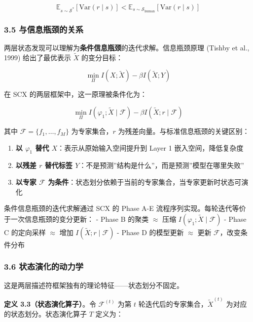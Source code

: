 \documentclass[
  12pt,
]{ctexart}
\providecommand{\tightlist}{%
  \setlength{\itemsep}{0pt}\setlength{\parskip}{0pt}}
\begin{document}
\[\mathbb{E}_{s \sim \mathcal{S}^*}[\text{Var}(r \mid s)] < \mathbb{E}_{s \sim \mathcal{S}_{\text{human}}}[\text{Var}(r \mid s)]\]

\subsubsection{3.5
与信息瓶颈的关系}\label{ux4e0eux4fe1ux606fux74f6ux9888ux7684ux5173ux7cfb}

两层状态发现可以理解为\textbf{条件信息瓶颈}的迭代求解。信息瓶颈原理
(Tishby et al., 1999) 给出了最优表示 \(\tilde{X}\) 的变分目标：

\[\min_{\Pi} I(X; \tilde{X}) - \beta I(\tilde{X}; Y)\]

在 SCX 的两层框架中，这一原理被条件化为：

\[\min_{\Pi} I(\varphi_1; \tilde{X} \mid \mathcal{F}) - \beta I(\tilde{X}; r \mid \mathcal{F})\]

其中 \(\mathcal{F} = \{f_1, \dots, f_M\}\) 为专家集合，\(r\)
为残差向量。与标准信息瓶颈的关键区别：

\begin{enumerate}
\def\labelenumi{\arabic{enumi}.}
\tightlist
\item
  \textbf{以 \(\varphi_1\) 替代 \(X\)}：表示从原始输入空间提升到 Layer 1
  嵌入空间，降低复杂度
\item
  \textbf{以残差 \(r\) 替代标签
  \(Y\)}：不是预测''结构是什么''，而是预测''模型在哪里失败''
\item
  \textbf{以专家 \(\mathcal{F}\)
  为条件}：状态划分依赖于当前的专家集合，当专家更新时状态可演化
\end{enumerate}

条件信息瓶颈的迭代求解通过 SCX 的 Phase A-E
流程序列实现。每轮迭代等价于一次信息瓶颈的变分更新： - Phase B 的聚类
\(\approx\) 压缩 \(I(\varphi_1; \tilde{X} \mid \mathcal{F})\) - Phase C
的定向采样 \(\approx\) 增加 \(I(\tilde{X}; r \mid \mathcal{F})\) - Phase
D 的模型更新 \(\approx\) 更新 \(\mathcal{F}\)，改变条件分布

\subsubsection{3.6
状态演化的动力学}\label{ux72b6ux6001ux6f14ux5316ux7684ux52a8ux529bux5b66}

这是两层描述符框架独有的理论特征------状态划分不固定。

\textbf{定义 3.3（状态演化算子）}。令 \(\mathcal{F}^{(t)}\) 为第 \(t\)
轮迭代后的专家集合，\(\tilde{X}^{(t)}\) 为对应的状态划分。状态演化算子
\(T\) 定义为：
\end{document}
